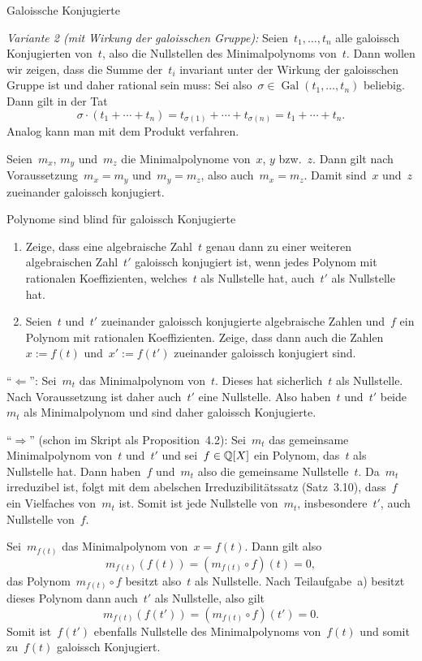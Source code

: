 \documentclass{algblatt}
\begin{document}
\begin{aufgabe}{Galoissche Konjugierte}
\begin{loesungE}
\emph{Variante 2 (mit Wirkung der galoisschen Gruppe):}
Seien~$t_1,\ldots,t_n$ alle galoissch Konjugierten von~$t$, also die
Nullstellen des Minimalpolynoms von~$t$. Dann wollen wir zeigen, dass die
Summe der~$t_i$ invariant unter der Wirkung der galoisschen Gruppe ist und
daher rational sein muss: Sei also~$\sigma \in
\operatorname{Gal}(t_1,\ldots,t_n)$ beliebig. Dann gilt in der Tat
\[ \sigma \cdot (t_1 + \cdots + t_n) =
  t_{\sigma(1)} + \cdots + t_{\sigma(n)} =
  t_1 + \cdots + t_n. \]
Analog kann man mit dem Produkt verfahren.

\item Seien~$m_x$, $m_y$ und~$m_z$ die Minimalpolynome von~$x$, $y$ bzw.~$z$.
Dann gilt nach Voraussetzung~$m_x = m_y$ und~$m_y = m_z$, also auch~$m_x =
m_z$. Damit sind~$x$ und~$z$ zueinander galoissch konjugiert.
\end{loesungE}
\end{aufgabe}

\begin{aufgabe}{Polynome sind blind für galoissch Konjugierte}
\begin{enumerate}
\item Zeige, dass eine algebraische Zahl~$t$ genau dann zu einer weiteren
algebraischen Zahl~$t'$ galoissch konjugiert ist, wenn jedes Polynom mit
rationalen Koeffizienten, welches~$t$ als Nullstelle hat, auch~$t'$ als
Nullstelle hat.
\item Seien~$t$ und~$t'$ zueinander galoissch konjugierte algebraische Zahlen
und~$f$ ein Polynom mit rationalen Koeffizienten. Zeige, dass dann auch die
Zahlen~$x := f(t)$ und~$x' := f(t')$ zueinander galoissch konjugiert sind.
\end{enumerate}

\begin{loesungE}
\item "`$\Longleftarrow$"': Sei~$m_t$ das Minimalpolynom von~$t$. Dieses hat
sicherlich~$t$ als Nullstelle. Nach Voraussetzung ist daher auch~$t'$ eine
Nullstelle. Also haben~$t$ und~$t'$ beide~$m_t$ als Minimalpolynom und sind
daher galoissch Konjugierte.

"`$\Longrightarrow$"' (schon im Skript als Proposition~4.2): Sei~$m_t$ das
gemeinsame Minimalpolynom von~$t$ und~$t'$
und sei~$f \in \mathbb{Q}[X]$ ein Polynom, das~$t$ als Nullstelle hat. Dann
haben~$f$ und~$m_t$ also die gemeinsame Nullstelle~$t$. Da~$m_t$ irreduzibel
ist, folgt mit dem abelschen Irreduzibilitätssatz (Satz~3.10), dass~$f$ ein
Vielfaches von~$m_t$ ist. Somit ist jede Nullstelle von~$m_t$,
insbesondere~$t'$, auch Nullstelle von~$f$.

\item Sei~$m_{f(t)}$ das Minimalpolynom von~$x = f(t)$. Dann gilt also
\[ m_{f(t)}(f(t)) = (m_{f(t)} \circ f)(t) = 0, \]
das Polynom~$m_{f(t)} \circ f$ besitzt also~$t$ als Nullstelle. Nach
Teilaufgabe~a) besitzt dieses Polynom dann auch~$t'$ als Nullstelle, also gilt
\[ m_{f(t)}(f(t')) = (m_{f(t)} \circ f)(t') = 0. \]
Somit ist~$f(t')$ ebenfalls Nullstelle des Minimalpolynoms von~$f(t)$ und somit
zu~$f(t)$ galoissch Konjugiert.
\end{loesungE}
\end{aufgabe}
\end{document}
